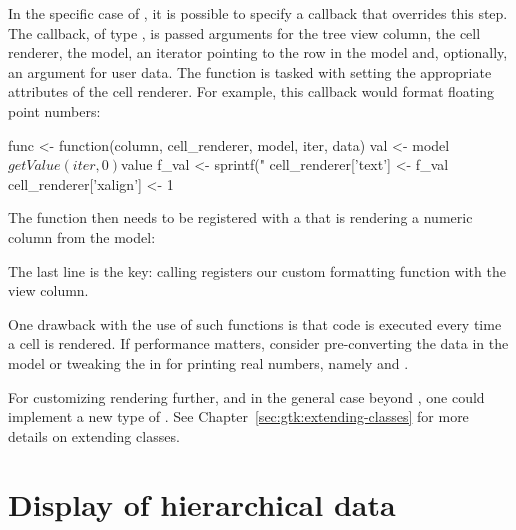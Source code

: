 In the specific case of , it is possible to specify a
callback that overrides this step.  The callback, of type
, is passed arguments for the tree view
column, the cell renderer, the model, an iterator pointing to the row
in the model and, optionally, an argument for user data. The function
is tasked with setting the appropriate attributes of the cell
renderer. For example, this callback would format floating point
numbers:
\begin{Schunk}
\begin{Sinput}
 func <- function(column, cell_renderer, model, iter, data) {
   val <- model$getValue(iter, 0)$value
   f_val <- sprintf("%
   cell_renderer['text'] <- f_val
   cell_renderer['xalign'] <- 1
 }
\end{Sinput}
\end{Schunk}
%
The function then needs to be registered with a
 that is rendering a numeric column from the model:
\begin{Schunk}
\end{Schunk}
%
The last line is the key: calling
 registers our custom
formatting function with the view column.

One drawback with the use of such functions is that \R\/ code is
executed every time a cell is rendered. If performance matters,
consider pre-converting the data in the model or tweaking the
 in \R\/ for printing real numbers, namely 
and .

For customizing rendering further, and in the general case beyond
, one could implement a new type of
.  See Chapter~\ref{sec:gtk:extending-classes}
for more details on extending \GTK\/ classes.


\section{Display of hierarchical data}
\label{sec:RGtk2:mvc:GtkTreeStore}


